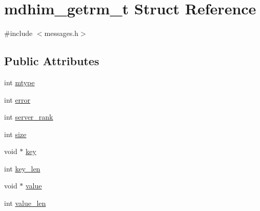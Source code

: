 \hypertarget{structmdhim__getrm__t}{\section{mdhim\-\_\-getrm\-\_\-t Struct Reference}
\label{d5/dfb/structmdhim__getrm__t}
}


{\ttfamily \#include $<$messages.\-h$>$}

\subsection*{Public Attributes}
\begin{DoxyCompactItemize}
\item 
int \hyperlink{structmdhim__getrm__t_af7c9cb5700c74dae330d00dcb53306a8}{mtype}
\item 
int \hyperlink{structmdhim__getrm__t_ab5a0bbbc5c249097b7ea3c71a8c59be9}{error}
\item 
int \hyperlink{structmdhim__getrm__t_ab7e6c3fdb4ba044166a37bf1e178b334}{server\-\_\-rank}
\item 
int \hyperlink{structmdhim__getrm__t_a850957632986ef7c1f352de7e126d6a4}{size}
\item 
void $\ast$ \hyperlink{structmdhim__getrm__t_a03ac590954131b0bd04b767115b011d2}{key}
\item 
int \hyperlink{structmdhim__getrm__t_a91f0d874ba5b81f1d22a791f4936653c}{key\-\_\-len}
\item 
void $\ast$ \hyperlink{structmdhim__getrm__t_ae1e2ce047de1164dcdb1bcfe0f6fd0ae}{value}
\item 
int \hyperlink{structmdhim__getrm__t_af5959ca99312966ae31a7ffec962d9ea}{value\-\_\-len}
\end{DoxyCompactItemize}


